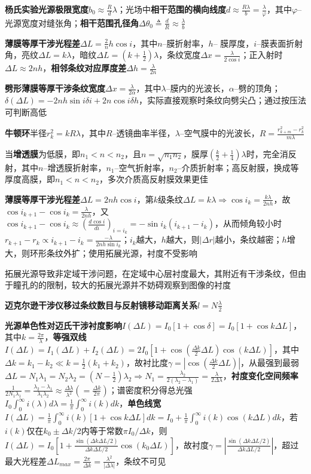 \documentclass[10pt,a4paper]{article}
\begin{document}
\textbf{杨氏实验光源极限宽度}$b_0\approx\frac{R}{d}\lambda$；光场中\textbf{相干范围的横向线度}$d\approx\frac{R\lambda}{b}=\frac{\lambda}{\varphi}$，其中$\varphi$-- 光源宽度对缝张角；\textbf{相干范围孔径角}$\Delta\theta_0\triangleq\frac{d}{R}\approx\frac{\lambda}{b}$

\textbf{薄膜等厚干涉光程差}$\Delta L=\frac2nh\cos i$，其中$n$--膜折射率，$h$-- 膜厚度，$i$--膜表面折射角，亮纹$\Delta L=k\lambda$，暗纹$\Delta L=(k+\frac{1}{2})\lambda$，条纹宽度$\Delta x=\frac{\lambda}{2\cos i}$；正入射时$\Delta L\approx2nh$，\textbf{相邻条纹对应厚度差}$\Delta h=\frac{\lambda}{2n}$

\textbf{劈形薄膜等厚干涉条纹宽度}$\Delta x=\frac{\lambda}{2\alpha}$，其中$\lambda$--膜内的光波长，$\alpha$--劈的顶角；$\delta(\Delta L)=-2nh\sin i
\delta i+2n\cos i\delta h$，实际直接观察时条纹向劈尖凸；通过按压法可判断高低

\textbf{牛顿环}半径$r_k^2=kR\lambda$，其中$R$--透镜曲率半径，$\lambda$--空气膜中的光波长，$R=\frac{r_{k+m}^2-r_k^2}{m\lambda}$

当\textbf{增透膜}为低膜，即$n_1<n<n_2$，且$n=\sqrt{n_1n_2}$，膜厚$(\frac{k}{2}+\frac{1}{4})\lambda$时，完全消反射，其中$n$--增透膜折射率，$n_1$--空气折射率，$n_2$--介质折射率；高反射膜，换成等厚度高膜，即$n_1<n<n_2$，多次介质高反射膜效果更佳

\textbf{薄膜等厚干涉光程差}$\Delta L=2nh\cos i$，第$k$级条纹$\Delta L=k\lambda\Longrightarrow\cos i_k=\frac{k\lambda}{2nh}$，故$\cos i_{k+1}-\cos i_{k}=\frac{\lambda}{2nh}$，又$\cos i_{k+1}-\cos i_{k}\approx(\frac{d\cos i}{di})_{i=i_k}=-\sin i_k(i_{k+1}-i_{k})$，从而倾角较小时$r_{k+1}-r_{k}\propto i_{k+1}-i_{k}=\frac{-\lambda}{2nh\sin i_k}$；$i_k$越大，$h$越大，则$|\Delta r|$越小，条纹越密；$h$增大，则环形条纹外扩；使用拓展光源，衬度不受影响

拓展光源导致非定域干涉问题，在定域中心层衬度最大，其附近有干涉条纹，但由于瞳孔的的限制，较大的拓展光源并不妨碍观察到图像的衬度

\textbf{迈克尔逊干涉仪移过条纹数目与反射镜移动距离关系}$l=N\frac{\lambda}{2}$

\textbf{光源单色性对迈氏干涉衬度影响}$I(\Delta L)=I_0[1+\cos\delta]=I_0[1+\cos k\Delta L]$，其中$k=\frac{2\pi}{\lambda}$，\textbf{等强双线}$I(\Delta L)=I_1(\Delta L)+I_2(\Delta L)=2I_0[1+\cos(\frac{\Delta k}{2}\Delta L)\cos(k\Delta L)]$，其中$\Delta k=k_1-k_2\ll k=\frac{1}{2}(k_1+k_2)$，故衬比度$\gamma=|\cos(\frac{\Delta k}{2}\Delta L)|$，从最强到最弱$\Delta L=N_1\lambda_1=N_2\lambda_2=(N-\frac{1}{2})\lambda_2\Longrightarrow N_1=\frac{\lambda_2}{2(\lambda_2-\lambda_1)}=\frac{\lambda}{2\Delta\lambda}$，\textbf{衬度变化空间频率}$\frac{1}{2N_1\lambda_1}=\frac{\lambda_2-\lambda_1}{\lambda_1\lambda_2}\approx\frac{\Delta\lambda}{\lambda^2}(=\frac{\Delta k}{2\pi})$；谱密度积分得总光强$I_0\int_0^\infty i(\lambda)d\lambda=\frac{1}{\pi}\int_0^\infty i(k)dk$，\textbf{单色线宽}$I(\Delta L)=\frac{1}{\pi}\int_0^\infty i(k)[1+\cos k\Delta L]dk=I_0+\frac{1}{\pi}\int_0^\infty i(k)\cos(k\Delta L)dk$，若$i(k)$仅在$k_0\pm\Delta k/2$内等于常数$\pi I_0/\Delta k$，则$I(\Delta L)=I_0[1+\frac{\sin(\Delta k\Delta L/2)}{\Delta k\Delta L/2}\cos(k_0\Delta L)]$，故衬度$\gamma=|\frac{\sin(\Delta k\Delta L/2)}{\Delta k\Delta L/2}|$，超过最大光程差$\Delta L_{max}=\frac{2\pi}{\Delta k}=\frac{\lambda^2}{|\Delta\lambda|}$，条纹不可见
\end{document}
